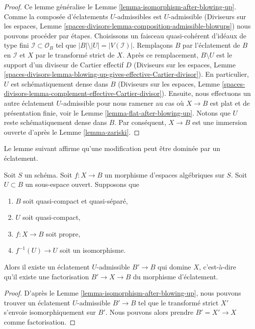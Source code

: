 \begin{proof}
Ce lemme généralise le
Lemme \ref{lemma-isomorphism-after-blowing-up}.
Comme la composée d'éclatements $U$-admissibles est $U$-admissible
(Diviseurs sur les espaces, Lemme
\ref{spaces-divisors-lemma-composition-admissible-blowups})
nous pouvons procéder par étapes. Choisissons un faisceau quasi-cohérent
d'idéaux de type fini $\mathcal{I} \subset \mathcal{O}_B$ tel que
$|B| \setminus |U| = |V(\mathcal{I})|$. Remplaçons $B$ par l'éclatement
de $B$ en $\mathcal{I}$ et $X$ par le transformé strict de $X$.
Après ce remplacement, $B \setminus U$ est le support d'un diviseur de
Cartier effectif $D$ (Diviseurs sur les espaces, Lemme
\ref{spaces-divisors-lemma-blowing-up-gives-effective-Cartier-divisor}).
En particulier, $U$ est schématiquement dense dans $B$
(Diviseurs sur les espaces, Lemme
\ref{spaces-divisors-lemma-complement-effective-Cartier-divisor}).
Ensuite, nous effectuons un autre éclatement $U$-admissible pour nous ramener au cas où
$X \to B$ est plat et de présentation finie, voir le
Lemme \ref{lemma-flat-after-blowing-up}. Notons que $U$ reste schématiquement
dense dans $B$. Par conséquent, $X \to B$ est une immersion ouverte d'après le
Lemme \ref{lemma-zariski}.
\end{proof}

\noindent
Le lemme suivant affirme qu'une modification peut être dominée
par un éclatement.

\begin{lemma}
\label{lemma-dominate-modification-by-blowup}
Soit $S$ un schéma. Soit $f : X \to B$ un morphisme d'espaces algébriques
sur $S$. Soit $U \subset B$ un sous-espace ouvert. Supposons que
\begin{enumerate}
\item $B$ soit quasi-compact et quasi-séparé,
\item $U$ soit quasi-compact,
\item $f : X \to B$ soit propre,
\item $f^{-1}(U) \to U$ soit un isomorphisme.
\end{enumerate}
Alors il existe un éclatement $U$-admissible $B' \to B$ qui domine $X$,
c'est-à-dire qu'il existe une factorisation $B' \to X \to B$
du morphisme d'éclatement.
\end{lemma}

\begin{proof}
D'après le Lemme \ref{lemma-isomorphism-after-blowing-up}, nous pouvons trouver un éclatement
$U$-admissible $B' \to B$ tel que le transformé strict $X'$ s'envoie isomorphiquement sur
$B'$. Nous pouvons alors prendre $B' = X' \to X$ comme factorisation.
\end{proof}

